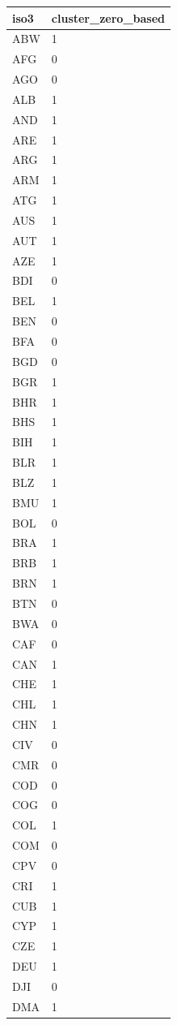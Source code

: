 \begin{tabular}{ll}
\hline
iso3 & cluster\_zero\_based \\
\hline
ABW & 1 \\
AFG & 0 \\
AGO & 0 \\
ALB & 1 \\
AND & 1 \\
ARE & 1 \\
ARG & 1 \\
ARM & 1 \\
ATG & 1 \\
AUS & 1 \\
AUT & 1 \\
AZE & 1 \\
BDI & 0 \\
BEL & 1 \\
BEN & 0 \\
BFA & 0 \\
BGD & 0 \\
BGR & 1 \\
BHR & 1 \\
BHS & 1 \\
BIH & 1 \\
BLR & 1 \\
BLZ & 1 \\
BMU & 1 \\
BOL & 0 \\
BRA & 1 \\
BRB & 1 \\
BRN & 1 \\
BTN & 0 \\
BWA & 0 \\
CAF & 0 \\
CAN & 1 \\
CHE & 1 \\
CHL & 1 \\
CHN & 1 \\
CIV & 0 \\
CMR & 0 \\
COD & 0 \\
COG & 0 \\
COL & 1 \\
COM & 0 \\
CPV & 0 \\
CRI & 1 \\
CUB & 1 \\
CYP & 1 \\
CZE & 1 \\
DEU & 1 \\
DJI & 0 \\
DMA & 1 \\

\end{tabular}
